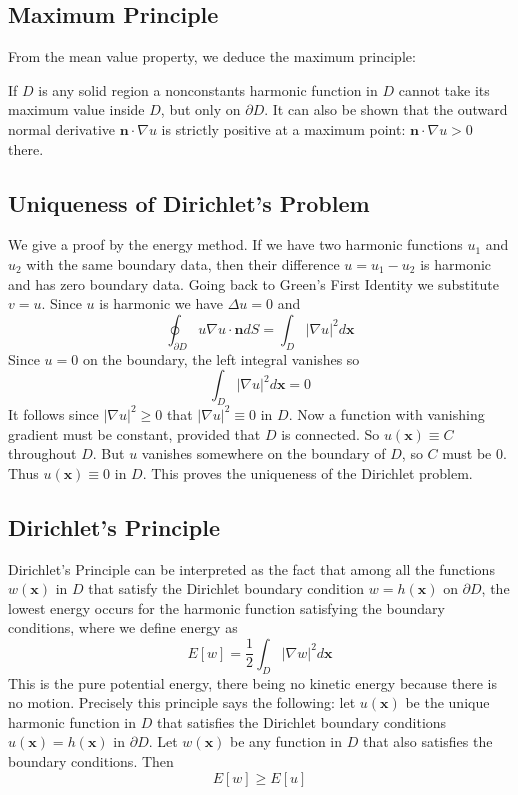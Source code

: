 \subsection{Maximum Principle}
From the mean value property, we deduce the maximum principle:

If $D$ is any solid region a nonconstants harmonic function in $D$ cannot take its maximum value inside $D$, but only on $\partial D$. It can also be shown that the outward normal derivative $\mathbf{n}\cdot \nabla u$ is strictly positive at a maximum point: $\mathbf{n}\cdot \nabla u > 0$ there. 

\subsection{Uniqueness of Dirichlet's Problem}

We give a proof by the energy method. If we have two harmonic functions $u_1$ and $u_2$ with the same boundary data, then their difference $u = u_1 - u_2$ is harmonic and has zero boundary data. Going back to Green's First Identity we substitute $v = u$. Since $u$ is harmonic we have $\Delta u = 0$ and \begin{equation*}
    \oint_{\partial D}u\nabla u \cdot \mathbf{n}dS = \int_D|\nabla u|^2d\mathbf{x}
\end{equation*}
Since $u = 0$ on the boundary, the left integral vanishes so $$\int_D|\nabla u|^2d\mathbf{x} = 0$$ It follows since $|\nabla u|^2 \geq 0$ that $|\nabla u|^2 \equiv 0$ in $D$. Now a function with vanishing gradient must be constant, provided that $D$ is connected. So $u(\mathbf{x}) \equiv C$ throughout $D$. But $u$ vanishes somewhere on the boundary of $D$, so $C$ must be $0$. Thus $u(\mathbf{x}) \equiv 0$ in $D$. This proves the uniqueness of the Dirichlet problem.

\subsection{Dirichlet's Principle}

Dirichlet's Principle can be interpreted as the fact that among all the functions $w(\mathbf{x})$ in $D$ that satisfy the Dirichlet boundary condition $w = h(\mathbf{x})$ on $\partial D$, the lowest energy occurs for the harmonic function satisfying the boundary conditions, where we define energy as \begin{equation*}
    E[w] = \frac{1}{2}\int_D|\nabla w|^2d\mathbf{x}
\end{equation*}
This is the pure potential energy, there being no kinetic energy because there is no motion. Precisely this principle says the following: let $u(\mathbf{x})$ be the unique harmonic function in $D$ that satisfies the Dirichlet boundary conditions $u(\mathbf{x}) = h(\mathbf{x})$ in $\partial D$. Let $w(\mathbf{x})$ be any function in $D$ that also satisfies the boundary conditions. Then\begin{equation*}
    E[w] \geq E[u]
\end{equation*}

